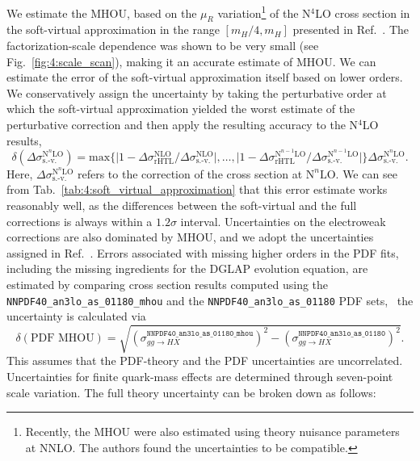 We estimate the \acs{MHOU}, based on the $\mu_R$ variation\footnote{Recently, the \acs{MHOU} were also estimated using theory nuisance parameters~\cite{Lim:2024nsk} at \acs{NNLO}. The authors found the uncertainties to be compatible.} of the N${}^4$LO cross section in the soft-virtual approximation in the range $[m_H/4, m_H]$ presented in Ref.~\cite{Das:2020adl}. The factorization-scale dependence was shown to be very small (see Fig.~\ref{fig:4:scale_scan}), making it an accurate estimate of \acs{MHOU}. We can estimate the error of the soft-virtual approximation itself based on lower orders. We conservatively assign the uncertainty by taking the perturbative order at which the soft-virtual approximation yielded the worst estimate of the perturbative correction and then apply the resulting accuracy to the N${}^4$LO results,
\begin{equation}
\delta(\Delta  \sigma^{\text{N}^n\text{LO}}_{\text{s.-v.}}) =  \text{max} \Big \lbrace \Big | 1 - \Delta \sigma^{\text{NLO}}_\text{rHTL}/ \Delta \sigma^{\text{NLO}}_{\text{s.-v.}} \Big |,\ldots,  \Big | 1 - \Delta \sigma^{\text{N}^{n-1}\text{LO}}_\text{rHTL}/\Delta \sigma^{\text{N}^{n-1}\text{LO}}_{\text{s.-v.}} \Big | \Big \rbrace \Delta  \sigma^{\text{N}^n\text{LO}}_{\text{s.-v.}}.
\label{eq:6:SV_error_estimate}
\end{equation}
Here, $\Delta \sigma^{\text{N}^n\text{LO}}_{\text{s.-v.}}$ refers to the correction of the cross section at $\text{N}^n\text{LO}$. We can see from Tab.~\ref{tab:4:soft_virtual_approximation} that this error estimate works reasonably well, as the differences between the soft-virtual and the full corrections is always within a $1.2 \sigma$ interval.
Uncertainties on the electroweak corrections are also dominated by \acs{MHOU}, and we adopt the uncertainties assigned in Ref.~\cite{Becchetti:2020wof}. Errors associated with missing higher orders in the \acs{PDF} fits, including the missing ingredients for the DGLAP evolution equation, are estimated by comparing cross section results computed using the \texttt{NNPDF40\_an3lo\_as\_01180\_mhou} and the \texttt{NNPDF40\_an3lo\_as\_01180} \acs{PDF} sets, \ie\ the uncertainty is calculated via
\begin{equation}
\delta (\text{PDF MHOU}) = \sqrt{\left(\sigma_{gg \rightarrow HX}^\mathtt{NNPDF40\_an3lo\_as\_01180\_mhou} \right)^2 - \left(\sigma_{gg \rightarrow HX}^\mathtt{NNPDF40\_an3lo\_as\_01180} \right)^2}.
\end{equation}
This assumes that the \acs{PDF}-theory and the \acs{PDF} uncertainties are uncorrelated. Uncertainties for finite quark-mass effects are determined through seven-point scale variation. The full theory uncertainty can be broken down as follows:
